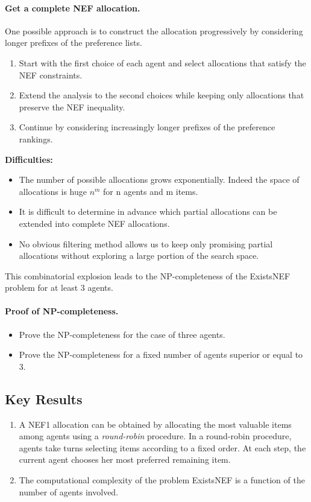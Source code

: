\documentclass[12pt,a4paper]{article}
\begin{document}
\paragraph{Get a complete NEF allocation.}
One possible approach is to construct the allocation progressively by considering longer prefixes of the preference lists.
\begin{enumerate}
    \item Start with the first choice of each agent and select allocations that satisfy the NEF constraints.

    \item Extend the analysis to the second choices while keeping only allocations that preserve the NEF inequality.

    \item Continue by considering increasingly longer prefixes of the preference rankings.
\end{enumerate}
\textbf{Difficulties:}
\begin{itemize}
    \item The number of possible allocations grows exponentially. Indeed the space of allocations is huge $n^m$ for n agents and m items.
    \item It is difficult to determine in advance which partial allocations can be extended into complete NEF allocations.
    \item No obvious filtering method allows us to keep only promising partial allocations without exploring a large portion of the search space.
\end{itemize}
This combinatorial explosion leads to the NP-completeness of the ExistsNEF problem for at least 3 agents.
\paragraph{Proof of NP-completeness.}
\begin{itemize}
    \item Prove the NP-completeness for the case of three agents.
    \item Prove the NP-completeness for a fixed number of agents superior or equal to 3.
\end{itemize}

\subsection*{Key Results}
\begin{enumerate}
    \item A NEF1 allocation can be obtained by allocating the most valuable items among agents using a \textit{round-robin} procedure. In a round-robin procedure, agents take turns selecting items according to a fixed order.  
At each step, the current agent chooses her most preferred remaining item.
    \item The computational complexity of the problem ExistsNEF is a function of the number of agents involved.
\end{enumerate}
\end{document}
